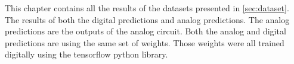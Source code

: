 \label{cap:results}

This chapter contains all the results of the datasets presented in \cref{sec:dataset}. The results of both the digital predictions and analog predictions. The analog predictions are the outputs of the analog circuit. Both the analog and digital predictions are using the same set of weights. Those weights were all trained digitally using the tensorflow python library.



\cleardoublepage
